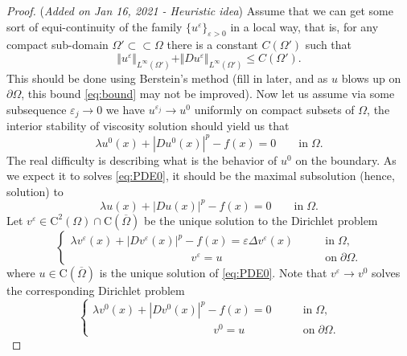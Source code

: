 \documentclass[11pt,reqno]{amsart}
\numberwithin{figure}{section}
\theoremstyle{plain}
\theoremstyle{remark}
\numberwithin{equation}{section}
\newcommand{\rmC}{\mathrm{C}}
\begin{document}
\color{blue}
\begin{proof} (\textit{Added on Jan 16, 2021 - Heuristic idea}) Assume that we can get some sort of equi-continuity of the family $\{u^\varepsilon\}_{\varepsilon>0}$ in a local way, that is, for any compact sub-domain $\Omega'\subset\subset \Omega$ there is a constant $C(\Omega')$ such that
\begin{equation}\label{eq:bound}
    \Vert u^\varepsilon\Vert_{L^\infty(\Omega')} +\Vert Du^\varepsilon\Vert_{L^\infty(\Omega')} \leq C(\Omega').
\end{equation}
This should be done using Berstein's method (fill in later, and as $u$ blows up on $\partial \Omega$, this bound \eqref{eq:bound} may not be improved). Now let us assume via some subsequence $\varepsilon_j\to 0$ we have $u^{\varepsilon_j}\rightarrow u^0$ uniformly on compact subsets of $\Omega$, the interior stability of viscosity solution should yield us that 
\begin{equation*}
    \lambda u^0(x) + |Du^0(x)|^p - f(x) = 0 \qquad\text{in}\;\Omega.
\end{equation*}
The real difficulty is describing what is the behavior of $u^0$ on the boundary. As we expect it to solves \eqref{eq:PDE0}, it should be the maximal subsolution (hence, solution) to 
\begin{equation}\label{eq:S_lambda}
    \lambda u(x) + |Du(x)|^p - f(x) = 0 \qquad\text{in}\;\Omega.
\end{equation}
Let $v^\varepsilon\in \rmC^2(\Omega)\cap \rmC(\overline{\Omega})$ be the unique solution to the Dirichlet problem
\begin{equation}\label{eq:v_eps}
\begin{cases}
    \lambda v^\varepsilon(x) + |Dv^\varepsilon(x)|^p - f(x) = \varepsilon \Delta v^\varepsilon(x) &\qquad\text{in}\;\Omega,\\
    \;\;\,\quad\quad\qquad\qquad\qquad\qquad v^\varepsilon = u &\qquad \text{on}\;\partial\Omega.
\end{cases}
\end{equation}
where $u\in \rmC(\overline{\Omega})$ is the unique solution of \eqref{eq:PDE0}. Note that $v^\varepsilon\rightarrow v^0$ solves the corresponding Dirichlet problem
\begin{equation}\label{eq:v_0}
\begin{cases}
    \lambda v^0(x) + |Dv^0(x)|^p - f(x) = 0 &\qquad\text{in}\;\Omega,\\
    \;\;\,\quad\quad\qquad\qquad\qquad\qquad v^0 = u &\qquad \text{on}\;\partial\Omega.

\end{cases}
\end{equation}
\end{proof}
\end{document}
